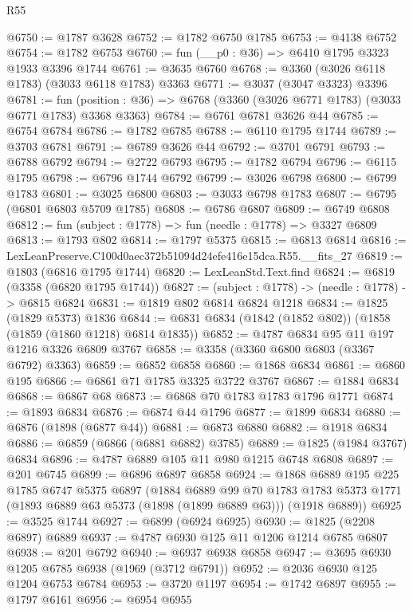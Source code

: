 \begin{lexlean}{R55}
\begin{coremodule}
@6750 := @1787 @3628
@6752 := @1782 @6750 @1785
@6753 := @4138 @6752
@6754 := @1782 @6753
@6760 := fun (__p0 : @36) => @6410 @1795 @3323 @1933 @3396 @1744
@6761 := @3635 @6760
@6768 := @3360 (@3026 @6118 @1783) (@3033 @6118 @1783) @3363
@6771 := @3037 (@3047 @3323) @3396
@6781 := fun (position : @36) => @6768 (@3360 (@3026 @6771 @1783) (@3033 @6771 @1783) @3368 @3363)
@6784 := @6761 @6781 @3626 @44
@6785 := @6754 @6784
@6786 := @1782 @6785
@6788 := @6110 @1795 @1744
@6789 := @3703 @6781
@6791 := @6789 @3626 @44
@6792 := @3701 @6791
@6793 := @6788 @6792
@6794 := @2722 @6793
@6795 := @1782 @6794
@6796 := @6115 @1795
@6798 := @6796 @1744 @6792
@6799 := @3026 @6798
@6800 := @6799 @1783
@6801 := @3025 @6800
@6803 := @3033 @6798 @1783
@6807 := @6795 (@6801 @6803 @5709 @1785)
@6808 := @6786 @6807
@6809 := @6749 @6808
@6812 := fun (subject : @1778) => fun (needle : @1778) => @3327 @6809
@6813 := @1793 @802
@6814 := @1797 @5375
@6815 := @6813 @6814
@6816 := LexLeanPreserve.C100d0aec372b51094d24efe416e15dca.R55.__fits_27
@6819 := @1803 (@6816 @1795 @1744)
@6820 := LexLeanStd.Text.find
@6824 := @6819 (@3358 (@6820 @1795 @1744))
@6827 := (subject : @1778) -> (needle : @1778) -> @6815 @6824
@6831 := @1819 @802 @6814 @6824 @1218
@6834 := @1825 (@1829 @5373) @1836
@6844 := @6831 @6834 (@1842 (@1852 @802)) (@1858 (@1859 (@1860 @1218) @6814 @1835))
@6852 := @4787 @6834 @95 @11 @197 @1216 @3326 @6809 @3767
@6858 := @3358 (@3360 @6800 @6803 (@3367 @6792) @3363)
@6859 := @6852 @6858
@6860 := @1868 @6834
@6861 := @6860 @195
@6866 := @6861 @71 @1785 @3325 @3722 @3767
@6867 := @1884 @6834
@6868 := @6867 @68
@6873 := @6868 @70 @1783 @1783 @1796 @1771
@6874 := @1893 @6834
@6876 := @6874 @44 @1796
@6877 := @1899 @6834
@6880 := @6876 (@1898 (@6877 @44))
@6881 := @6873 @6880
@6882 := @1918 @6834
@6886 := @6859 (@6866 (@6881 @6882) @3785)
@6889 := @1825 (@1984 @3767) @6834
@6896 := @4787 @6889 @105 @11 @980 @1215 @6748 @6808
@6897 := @201 @6745
@6899 := @6896 @6897 @6858
@6924 := @1868
    @6889
    @195
    @225
    @1785
    @6747
    @5375
    @6897
    (@1884
      @6889
      @99
      @70
      @1783
      @1783
      @5373
      @1771
      (@1893 @6889 @63 @5373 (@1898 (@1899 @6889 @63)))
      (@1918 @6889))
@6925 := @3525 @1744
@6927 := @6899 (@6924 @6925)
@6930 := @1825 (@2208 @6897) @6889
@6937 := @4787 @6930 @125 @11 @1206 @1214 @6785 @6807
@6938 := @201 @6792
@6940 := @6937 @6938 @6858
@6947 := @3695 @6930 @1205 @6785 @6938 (@1969 (@3712 @6791))
@6952 := @2036 @6930 @125 @1204 @6753 @6784
@6953 := @3720 @1197
@6954 := @1742 @6897
@6955 := @1797 @6161
@6956 := @6954 @6955

\end{coremodule}
\end{lexlean}
